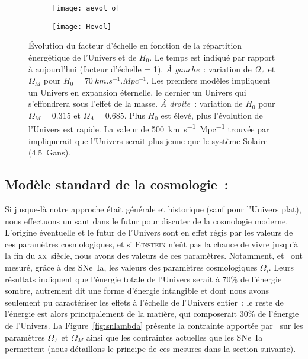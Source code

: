 \documentclass[../main/main.tex]{subfiles}
\begin{document}
\begin{figure}[ht]
    \centering
    \begin{subfigure}[c]{.48\linewidth}
        \centering
        \texttt{[image: aevol\_o]}
        \label{fig:aevol_l}
    \end{subfigure}
    \hfill
    \begin{subfigure}[c]{.48\linewidth}
        \centering
        \texttt{[image: Hevol]}
        \label{fig:aevol_r}
    \end{subfigure}
    \caption[Évolution du facteur d'échelle en fonction de la répartition
    énergétique de l'Univers et de $H_0$]{Évolution du facteur d'échelle en
        fonction de la répartition énergétique de l'Univers et de $H_0$. Le
        temps est indiqué par rapport à aujourd'hui (facteur d'échelle = 1).
        \textit{À gauche}~: variation de $\Omega_\Lambda$ et $\Omega_M$ pour
        $H_0 = \SI{70}{km.s^{-1}.Mpc^{-1}}$. Les premiers modèles impliquent un
        Univers en expansion éternelle, le dernier un Univers qui s'effondrera
        sous l'effet de la masse. \textit{À droite}~: variation de $H_0$ pour
        $\Omega_M = \num{0.315}$ et $\Omega_{\Lambda} = \num{0.685}$. Plus $H_0$
        est élevé, plus l'évolution de l'Univers est rapide. La valeur de
        \SI{500}{km.s^{-1}.Mpc^{-1}} trouvée par \cite{hubble1929} impliquerait
        que l'Univers serait plus jeune que le système Solaire
    (\SI{4.5}{Gans}\protect\footnotemark).}\label{fig:aevol}
\end{figure}

\subsection{Modèle standard de la cosmologie~: \lcdm}\label{sec:MS}

Si jusque-là notre approche était générale et historique (sauf pour l'Univers
plat), nous effectuons un saut dans le futur pour discuter de la cosmologie
moderne. L'origine éventuelle et le futur de l'Univers sont en effet régis par
les valeurs de ces paramètres cosmologiques, et si \textsc{Einstein} n'eût pas
la chance de vivre jusqu'à la fin du \textsc{xx}\ieme~siècle, nous avons des
valeurs de ces paramètres. Notamment, \cite{riess1998} et~\cite{perlmutter1999}
ont mesuré, grâce à des SNe~Ia, les valeurs des paramètres cosmologiques
$\Omega_i$. Leurs résultats indiquent que l'énergie totale de l'Univers serait à
70\% de l'énergie sombre, autrement dit une forme d'énergie intangible et dont
nous avons seulement pu caractériser les effets à l'échelle de l'Univers
entier~; le reste de l'énergie est alors principalement de la matière, qui
composerait 30\% de l'énergie de l'Univers. La Figure~\ref{fig:snlambda}
présente la contrainte apportée par~\cite{riess1998} sur les paramètres
$\Omega_\Lambda$ et $\Omega_M$ ainsi que les contraintes actuelles que les
SNe~Ia permettent (nous détaillons le principe de ces mesures dans la section
suivante).
\end{document}
